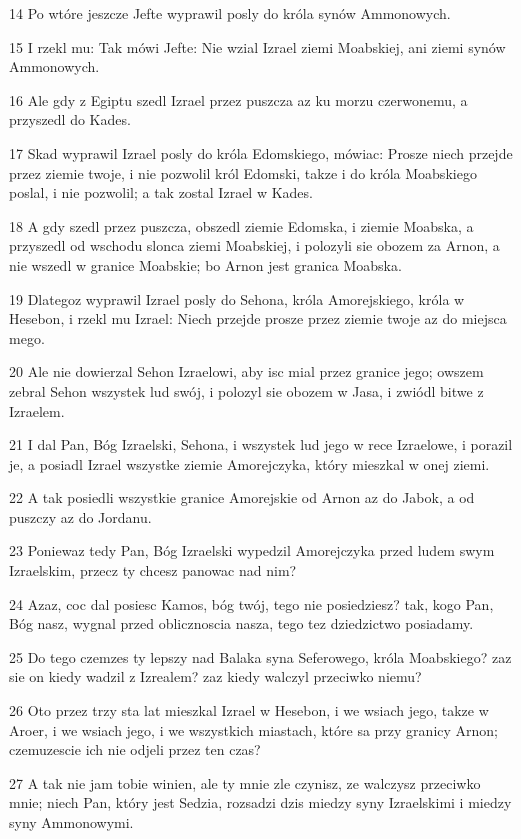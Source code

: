 \par 14 Po wtóre jeszcze Jefte wyprawil posly do króla synów Ammonowych.
\par 15 I rzekl mu: Tak mówi Jefte: Nie wzial Izrael ziemi Moabskiej, ani ziemi synów Ammonowych.
\par 16 Ale gdy z Egiptu szedl Izrael przez puszcza az ku morzu czerwonemu, a przyszedl do Kades.
\par 17 Skad wyprawil Izrael posly do króla Edomskiego, mówiac: Prosze niech przejde przez ziemie twoje, i nie pozwolil król Edomski, takze i do króla Moabskiego poslal, i nie pozwolil; a tak zostal Izrael w Kades.
\par 18 A gdy szedl przez puszcza, obszedl ziemie Edomska, i ziemie Moabska, a przyszedl od wschodu slonca ziemi Moabskiej, i polozyli sie obozem za Arnon, a nie wszedl w granice Moabskie; bo Arnon jest granica Moabska.
\par 19 Dlategoz wyprawil Izrael posly do Sehona, króla Amorejskiego, króla w Hesebon, i rzekl mu Izrael: Niech przejde prosze przez ziemie twoje az do miejsca mego.
\par 20 Ale nie dowierzal Sehon Izraelowi, aby isc mial przez granice jego; owszem zebral Sehon wszystek lud swój, i polozyl sie obozem w Jasa, i zwiódl bitwe z Izraelem.
\par 21 I dal Pan, Bóg Izraelski, Sehona, i wszystek lud jego w rece Izraelowe, i porazil je, a posiadl Izrael wszystke ziemie Amorejczyka, który mieszkal w onej ziemi.
\par 22 A tak posiedli wszystkie granice Amorejskie od Arnon az do Jabok, a od puszczy az do Jordanu.
\par 23 Poniewaz tedy Pan, Bóg Izraelski wypedzil Amorejczyka przed ludem swym Izraelskim, przecz ty chcesz panowac nad nim?
\par 24 Azaz, coc dal posiesc Kamos, bóg twój, tego nie posiedziesz? tak, kogo Pan, Bóg nasz, wygnal przed oblicznoscia nasza, tego tez dziedzictwo posiadamy.
\par 25 Do tego czemzes ty lepszy nad Balaka syna Seferowego, króla Moabskiego? zaz sie on kiedy wadzil z Izrealem? zaz kiedy walczyl przeciwko niemu?
\par 26 Oto przez trzy sta lat mieszkal Izrael w Hesebon, i we wsiach jego, takze w Aroer, i we wsiach jego, i we wszystkich miastach, które sa przy granicy Arnon; czemuzescie ich nie odjeli przez ten czas?
\par 27 A tak nie jam tobie winien, ale ty mnie zle czynisz, ze walczysz przeciwko mnie; niech Pan, który jest Sedzia, rozsadzi dzis miedzy syny Izraelskimi i miedzy syny Ammonowymi.

